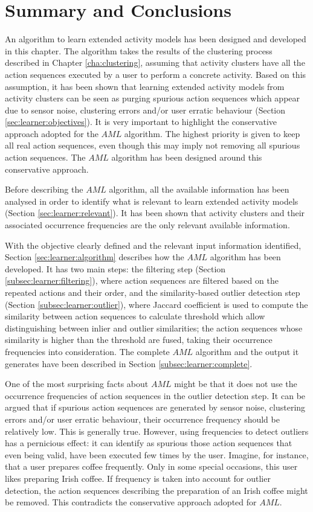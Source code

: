 \section{Summary and Conclusions}
\label{sec:learner:summary}

An algorithm to learn extended activity models has been designed and developed in this chapter. The algorithm takes the results of the clustering process described in Chapter \ref{cha:clustering}, assuming that activity clusters have all the action sequences executed by a user to perform a concrete activity. Based on this assumption, it has been shown that learning extended activity models from activity clusters can be seen as purging spurious action sequences which appear due to sensor noise, clustering errors and/or user erratic behaviour (Section \ref{sec:learner:objectives}). It is very important to highlight the conservative approach adopted for the $AML$ algorithm. The highest priority is given to keep all real action sequences, even though this may imply not removing all spurious action sequences. The $AML$ algorithm has been designed around this conservative approach.

Before describing the $AML$ algorithm, all the available information has been analysed in order to identify what is relevant to learn extended activity models (Section \ref{sec:learner:relevant}). It has been shown that activity clusters and their associated occurrence frequencies are the only relevant available information.

With the objective clearly defined and the relevant input information identified, Section \ref{sec:learner:algorithm} describes how the $AML$ algorithm has been developed. It has two main steps: the filtering step (Section \ref{subsec:learner:filtering}), where action sequences are filtered based on the repeated actions and their order, and the similarity-based outlier detection step (Section \ref{subsec:learner:outlier}), where Jaccard coefficient is used to compute the similarity between action sequences to calculate threshold which allow distinguishing between inlier and outlier similarities; the action sequences whose similarity is higher than the threshold are fused, taking their occurrence frequencies into consideration. The complete $AML$ algorithm and the output it generates have been described in Section \ref{subsec:learner:complete}. 

One of the most surprising facts about $AML$ might be that it does not use the occurrence frequencies of action sequences in the outlier detection step. It can be argued that if spurious action sequences are generated by sensor noise, clustering errors and/or user erratic behaviour, their occurrence frequency should be relatively low. This is generally true. However, using frequencies to detect outliers has a pernicious effect: it can identify as spurious those action sequences that even being valid, have been executed few times by the user. Imagine, for instance, that a user prepares coffee frequently. Only in some special occasions, this user likes preparing Irish coffee. If frequency is taken into account for outlier detection, the action sequences describing the preparation of an Irish coffee might be removed. This contradicts the conservative approach adopted for $AML$.

